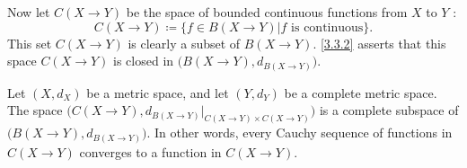 \begin{note}
  Now let \(C(X \to Y)\) be the space of bounded continuous functions from \(X\) to \(Y\) :
  \[
    C(X \to Y) \coloneqq \{f \in B(X \to Y) | f \text{ is continuous}\}.
  \]
  This set \(C(X \to Y)\) is clearly a subset of \(B(X \to Y)\).
  \cref{3.3.2} asserts that this space \(C(X \to Y)\) is closed in \(\big(B(X \to Y), d_{B(X \to Y)}\big)\).
\end{note}

\begin{thm}\label{3.4.5}
  Let \((X, d_X)\) be a metric space, and let \((Y, d_Y)\) be a complete metric space.
  The space \(\big(C(X \to Y), d_{B(X \to Y)}|_{C(X \to Y) \times C(X \to Y)}\big)\) is a complete subspace of \(\big(B(X \to Y), d_{B(X \to Y)}\big)\).
  In other words, every Cauchy sequence of functions in \(C(X \to Y)\) converges to a function in \(C(X \to Y)\).
\end{thm}

